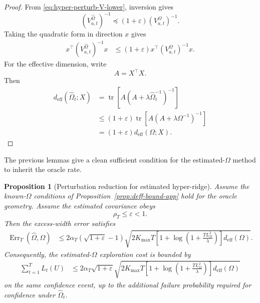 \documentclass{article} %
\newtheorem{proposition}[theorem]{Proposition}
\begin{document}
\begin{proof}
From \eqref{eq:hyper-perturb-V-lower}, inversion gives
\begin{equation}
\label{eq:hyper-perturb-width-proof-inv}
\left(V_{a,t}^{\widehat{\Omega}}\right)^{-1}
\preceq
(1+\varepsilon)
\left(V_{a,t}^{\Omega}\right)^{-1}.
\end{equation}
Taking the quadratic form in direction \(x\) gives
\begin{align}
\label{eq:hyper-perturb-width-proof-qf}
x^\top
\left(V_{a,t}^{\widehat{\Omega}}\right)^{-1}
x
&\le
(1+\varepsilon)
x^\top
\left(V_{a,t}^{\Omega}\right)^{-1}
x .
\end{align}
For the effective dimension, write
\begin{equation}
\label{eq:hyper-perturb-deff-proof-A}
A=X^\top X .
\end{equation}
Then
\begin{align}
\label{eq:hyper-perturb-deff-proof}
d_{\mathrm{eff}}(\widehat{\Omega}_t;X)
&=
\operatorname{tr}
\!\left[
A
\left(
A+\lambda\widehat{\Omega}_t^{-1}
\right)^{-1}
\right]
\\
&\le
(1+\varepsilon)
\operatorname{tr}
\!\left[
A
\left(
A+\lambda\Omega^{-1}
\right)^{-1}
\right]
\\
&=
(1+\varepsilon)
d_{\mathrm{eff}}(\Omega;X).
\end{align}
\end{proof}

The previous lemmas give a clean sufficient condition for the estimated-\(\Omega\) method to inherit the oracle rate.

\begin{proposition}[Perturbation reduction for estimated hyper-ridge]
\label{prop:hyper-estimated-perturbation}
Assume the known-\(\Omega\) conditions of Proposition~\ref{prop:deff-bound-app} hold for the oracle geometry.  Assume the estimated covariance obeys
\begin{equation}
\label{eq:hyper-est-prop-rho}
\rho_T\le \varepsilon<1 .
\end{equation}
Then the excess-width error satisfies
\begin{align}
\label{eq:hyper-est-prop-err-bound}
\operatorname{Err}_T(\widehat{\Omega},\Omega)
&\le
2\alpha_T
\left(\sqrt{1+\varepsilon}-1\right)
\sqrt{
2K_{\max}T
\left[
1+\log\!\left(1+\frac{TL_{\Omega}^{2}}{\lambda}\right)
\right]
d_{\mathrm{eff}}(\Omega)
}.
\end{align}
Consequently, the estimated-\(\Omega\) exploration cost is bounded by
\begin{align}
\label{eq:hyper-est-prop-total-bound}
\sum_{t=1}^{T}L_t(U)
&\le
2\alpha_T\sqrt{1+\varepsilon}
\sqrt{
2K_{\max}T
\left[
1+\log\!\left(1+\frac{TL_{\Omega}^{2}}{\lambda}\right)
\right]
d_{\mathrm{eff}}(\Omega)
}
\end{align}
on the same confidence event, up to the additional failure probability required for confidence under \(\widehat{\Omega}_t\).
\end{proposition}
\end{document}
